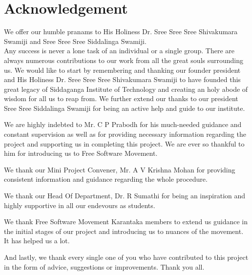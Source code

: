 \section*{Acknowledgement}

We offer our humble pranams to His Holiness Dr. Sree Sree Sree Shivakumara Swamiji and Sree Sree Sree Siddalinga Swamiji.
\\

Any success is never a lone task of an individual or a single group. There are always numerous contributions to our work from all the great souls surrounding us.
We would like to start by remembering and thanking our founder president and His Holiness Dr. Sree Sree Sree Shivakumara Swamiji to have founded this great legacy of Siddaganga Institute of Technology and creating an holy abode of wisdom for all us to reap from. We further extend our thanks to our president Sree Sree Siddalinga Swamiji for being an active help and guide to our institute.

We are highly indebted to Mr. C P Prabodh for his much-needed guidance and constant supervision as well as for providing necessary information regarding the project and supporting us in completing this project. We are ever so thankful to him for introducing us to Free Software Movement.

We thank our Mini Project Convener, Mr. A V Krishna Mohan for providing consistent information and guidance regarding the whole procedure. 

We thank our Head Of Department, Dr. R Sumathi for being an inspiration and highly supportive in all our endevours as students. 

We thank Free Software Movement Karantaka members to extend us guidance in the initial stages of our project and introducing us to nuances of the movement. It has helped us a lot.

And lastly, we thank every single one of you who have contributed to this project in the form of advice, suggestions or improvements. Thank you all.


